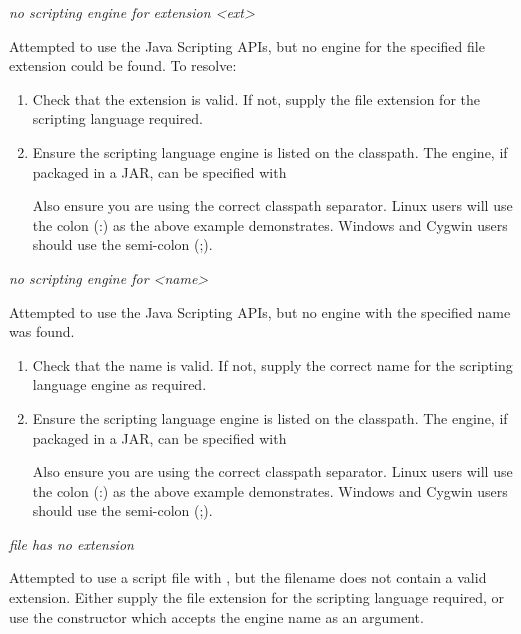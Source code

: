\noindent
\textit{no scripting engine for extension <ext>}
\begin{indented}
  Attempted to use the Java Scripting APIs, but no engine for the specified file extension could be found.  To resolve:
  \begin{enumerate}
    \item Check that the extension is valid.  If not, supply the file extension for the scripting language required.
    \item Ensure the scripting language engine is listed on the classpath.  The engine, if packaged in a JAR, can be specified with
      \begin{indented}
      \end{indented}
      Also ensure you are using the correct classpath separator.  Linux users will use the colon (:) as the above example demonstrates.  Windows and Cygwin users should use the
      semi-colon (;).
  \end{enumerate}
\end{indented}

\noindent
\textit{no scripting engine for <name>}
\begin{indented}
  Attempted to use the Java Scripting APIs, but no engine with the specified name was found.
  \begin{enumerate}
    \item Check that the name is valid.  If not, supply the correct name for the scripting language engine as required.
    \item Ensure the scripting language engine is listed on the classpath.  The engine, if packaged in a JAR, can be specified with
      \begin{indented}
      \end{indented}
      Also ensure you are using the correct classpath separator.  Linux users will use the colon (:) as the above example demonstrates.  Windows and Cygwin users should use the
      semi-colon (;).
  \end{enumerate}
\end{indented}

\noindent
\textit{file has no extension}
\begin{indented}
  Attempted to use a script file with , but the filename does not contain a valid extension.  Either supply the file extension for the scripting language required, or use the constructor which accepts the engine name as an argument.
\end{indented}

